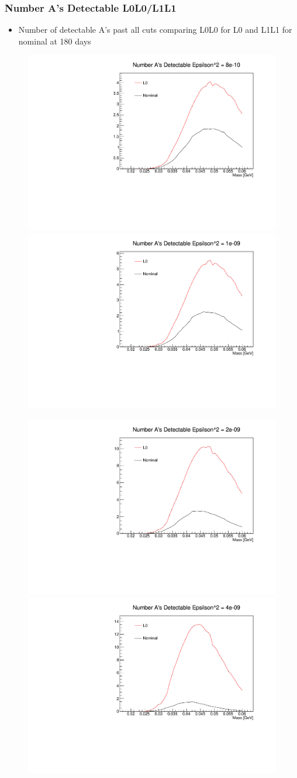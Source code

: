 \documentclass{beamer}
\begin{document}
\begin{frame}
\frametitle{Number A's Detectable L0L0/L1L1}
\begin{itemize}
\item Number of detectable A's past all cuts comparing L0L0 for L0 and L1L1 for nominal at 180 days
\end{itemize}
\begin{figure}
\includegraphics[width=0.36\linewidth]{figs/detectable_8e-10.pdf}
\includegraphics[width=0.36\linewidth]{figs/detectable_1e-09.pdf}
\end{figure}
\begin{figure}
\includegraphics[width=0.36\linewidth]{figs/detectable_2e-09.pdf}
\includegraphics[width=0.36\linewidth]{figs/detectable_4e-09.pdf}
\end{figure}

\end{frame}

\end{document}
